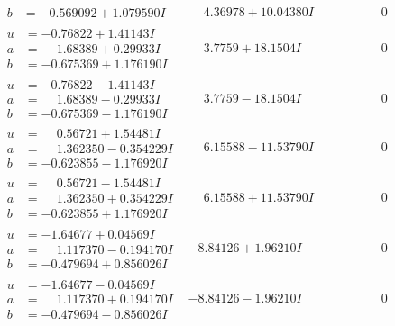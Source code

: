 \documentclass[1p]{elsarticle_modified}
\theoremstyle{definition}
\begin{document}
$$\begin{array}{c|c|c}
\begin{aligned}
b &= -0.569092 + 1.079590 I\end{aligned}
 & \phantom{-}4.36978 + 10.04380 I & \phantom{-0.000000 } 0 \\ \hline\begin{aligned}
u &= -0.76822 + 1.41143 I \\
a &= \phantom{-}1.68389 + 0.29933 I \\
b &= -0.675369 + 1.176190 I\end{aligned}
 & \phantom{-}3.7759 + 18.1504 I & \phantom{-0.000000 } 0 \\ \hline\begin{aligned}
u &= -0.76822 - 1.41143 I \\
a &= \phantom{-}1.68389 - 0.29933 I \\
b &= -0.675369 - 1.176190 I\end{aligned}
 & \phantom{-}3.7759 - 18.1504 I & \phantom{-0.000000 } 0 \\ \hline\begin{aligned}
u &= \phantom{-}0.56721 + 1.54481 I \\
a &= \phantom{-}1.362350 - 0.354229 I \\
b &= -0.623855 - 1.176920 I\end{aligned}
 & \phantom{-}6.15588 - 11.53790 I & \phantom{-0.000000 } 0 \\ \hline\begin{aligned}
u &= \phantom{-}0.56721 - 1.54481 I \\
a &= \phantom{-}1.362350 + 0.354229 I \\
b &= -0.623855 + 1.176920 I\end{aligned}
 & \phantom{-}6.15588 + 11.53790 I & \phantom{-0.000000 } 0 \\ \hline\begin{aligned}
u &= -1.64677 + 0.04569 I \\
a &= \phantom{-}1.117370 - 0.194170 I \\
b &= -0.479694 + 0.856026 I\end{aligned}
 & -8.84126 + 1.96210 I & \phantom{-0.000000 } 0 \\ \hline\begin{aligned}
u &= -1.64677 - 0.04569 I \\
a &= \phantom{-}1.117370 + 0.194170 I \\
b &= -0.479694 - 0.856026 I\end{aligned}
 & -8.84126 - 1.96210 I & \phantom{-0.000000 } 0 \\ \hline\begin{aligned}

\end{aligned}
\end{array}$$
\end{document}
